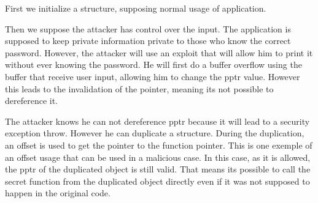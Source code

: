 \documentclass[a4paper, 11pt]{article}
\begin{document}
\def\boxheight{2}
\def\boxwidth{5}

\newcommand{\drawStruct}[4][]{

    \foreach \i [count=\j from 0] in {#4} {
        \draw[fill=green!10, #1] (#2, #3 - \j*\boxheight) rectangle 
        (#2 + \boxwidth, #3 - \j*\boxheight + \boxheight);
        \node at (#2 + \boxwidth/2, #3 - \j*\boxheight + 0.5*\boxheight) {\i};
    }
}
First we initialize a structure, supposing normal usage of application.
\begin{center}
\end{center}
Then we suppose the attacker has control over the input. The application is supposed to keep private information private to those who know the correct password. However, the attacker will use an exploit that will allow him to print it without ever knowing the password.
He will first do a buffer overflow using the buffer that receive user input, allowing him to change the pptr value. However this leads to the invalidation of the pointer, meaning its not possible to dereference it.
\begin{center}
\end{center}
The attacker knows he can not dereference pptr because it will lead to a security exception throw. However he can duplicate a structure.
During the duplication, an offset is used to get the pointer to the function pointer. This is one exemple of an offset usage that can be used in a malicious case. In this case, as it is allowed, the pptr of the duplicated object is still valid.
That means its possible to call the secret function from the duplicated object directly even if it was not supposed to happen in the original code.

\end{document}
